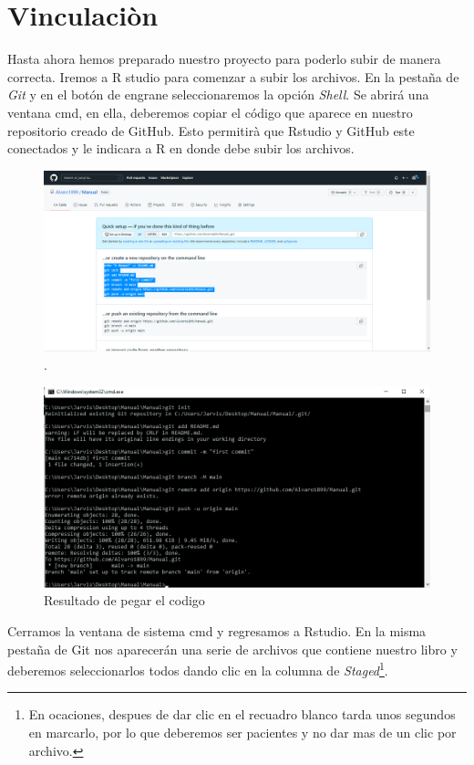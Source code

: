\documentclass[
  11pt,
  spanish,
  oneside]{book}
\begin{document}
\hypertarget{vinculaciuxf2n}{%
\section*{Vinculaciòn}\label{vinculaciuxf2n}}

Hasta ahora hemos preparado nuestro proyecto para poderlo subir de manera correcta. Iremos a R studio para comenzar a subir los archivos. En la pestaña de \emph{Git} y en el botón de engrane seleccionaremos la opción \emph{Shell}. Se abrirá una ventana cmd, en ella, deberemos copiar el código que aparece en nuestro repositorio creado de GitHub. Esto permitirà que Rstudio y GitHub este conectados y le indicara a R en donde debe subir los archivos.

\begin{figure}

{\centering \includegraphics[width=0.7\linewidth]{imagenes/Imagen 9} 

}

\caption{.}\label{fig:unnamed-chunk-9}
\end{figure}

\begin{figure}

{\centering \includegraphics[width=0.7\linewidth]{imagenes/Imagen 11} 

}

\caption{Resultado de pegar el codigo}\label{fig:unnamed-chunk-10}
\end{figure}

Cerramos la ventana de sistema cmd y regresamos a Rstudio. En la misma pestaña de Git nos aparecerán una serie de archivos que contiene nuestro libro y deberemos seleccionarlos todos dando clic en la columna de \emph{Staged}\footnote{En ocaciones, despues de dar clic en el recuadro blanco tarda unos segundos en marcarlo, por lo que deberemos ser pacientes y no dar mas de un clic por archivo.}.
\end{document}
